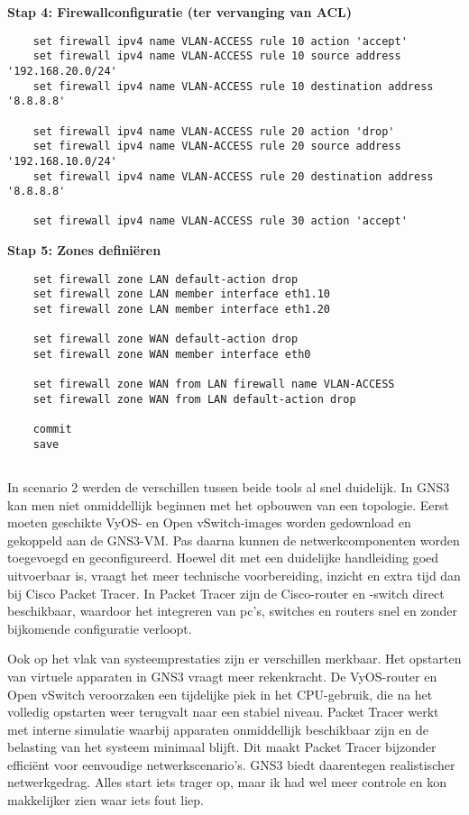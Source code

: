 \textbf{Stap 4: Firewallconfiguratie (ter vervanging van ACL)}
\begin{verbatim}
    set firewall ipv4 name VLAN-ACCESS rule 10 action 'accept'
    set firewall ipv4 name VLAN-ACCESS rule 10 source address '192.168.20.0/24'
    set firewall ipv4 name VLAN-ACCESS rule 10 destination address '8.8.8.8'
    
    set firewall ipv4 name VLAN-ACCESS rule 20 action 'drop'
    set firewall ipv4 name VLAN-ACCESS rule 20 source address '192.168.10.0/24'
    set firewall ipv4 name VLAN-ACCESS rule 20 destination address '8.8.8.8'
    
    set firewall ipv4 name VLAN-ACCESS rule 30 action 'accept'
\end{verbatim}

\textbf{Stap 5: Zones definiëren}
\begin{verbatim}
    set firewall zone LAN default-action drop
    set firewall zone LAN member interface eth1.10
    set firewall zone LAN member interface eth1.20
    
    set firewall zone WAN default-action drop
    set firewall zone WAN member interface eth0
    
    set firewall zone WAN from LAN firewall name VLAN-ACCESS
    set firewall zone WAN from LAN default-action drop
    
    commit
    save
\end{verbatim}


\subsection{}

In scenario 2 werden de verschillen tussen beide tools al snel duidelijk. In GNS3 kan men niet onmiddellijk beginnen met het opbouwen van een topologie. Eerst moeten geschikte VyOS- en Open vSwitch-images worden gedownload en gekoppeld aan de GNS3-VM. Pas daarna kunnen de netwerkcomponenten worden toegevoegd en geconfigureerd. Hoewel dit met een duidelijke handleiding goed uitvoerbaar is, vraagt het meer technische voorbereiding, inzicht en extra tijd dan bij Cisco Packet Tracer. In Packet Tracer zijn de Cisco-router en -switch direct beschikbaar, waardoor het integreren van pc’s, switches en routers snel en zonder bijkomende configuratie verloopt.

\vspace{0.3cm}

Ook op het vlak van systeemprestaties zijn er verschillen merkbaar. Het opstarten van virtuele apparaten in GNS3 vraagt meer rekenkracht. De VyOS-router en Open vSwitch veroorzaken een tijdelijke piek in het CPU-gebruik, die na het volledig opstarten weer terugvalt naar een stabiel niveau. Packet Tracer werkt met interne simulatie waarbij apparaten onmiddellijk beschikbaar zijn en de belasting van het systeem minimaal blijft. Dit maakt Packet Tracer bijzonder efficiënt voor eenvoudige netwerkscenario’s. GNS3 biedt daarentegen realistischer netwerkgedrag. Alles start iets trager op, maar ik had wel meer controle en kon makkelijker zien waar iets fout liep.

